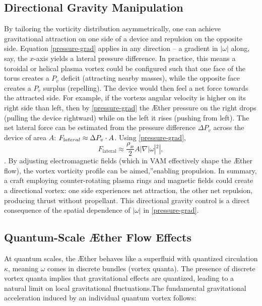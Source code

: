 \subsection*{Directional Gravity Manipulation}
By tailoring the vorticity distribution asymmetrically, one can achieve gravitational attraction on one side of a device and repulsion on the opposite side. Equation \eqref{pressure-grad} applies in any direction – a gradient in $|\omega|$ along, say, the $x$-axis yields a lateral pressure difference. In practice, this means a toroidal or helical plasma vortex could be configured such that one face of the torus creates a $P_v$ deficit (attracting nearby masses), while the opposite face creates a $P_v$ surplus (repelling). The device would then feel a net force towards the attracted side. For example, if the vortex\rqs s angular velocity is higher on its right side than left, then by \eqref{pressure-grad} the Æther pressure on the right drops (pulling the device rightward) while on the left it rises (pushing from left). The net lateral force can be estimated from the pressure difference $\Delta P_v$ across the device of area $A$: $F_{\textrm lateral}\approx \Delta P_v \cdot A$. Using \eqref{pressure-grad},
\begin{equation}
    F_\text{lateral} \approx \frac{\rho_\text{\ae}}{2} A |\nabla |\omega|^2|,
    \label{eq:lateral_force}
\end{equation}
. By adjusting electromagnetic fields (which in VAM effectively shape the Æther flow), the vortex vorticity profile can be \grqq aimed,\textquotedblright enabling propulsion. In summary, a craft employing counter-rotating plasma rings and magnetic fields could create a directional vortex: one side experiences net attraction, the other net repulsion, producing thrust without propellant. This directional gravity control is a direct consequence of the spatial dependence of $|\omega|$ in \eqref{pressure-grad}.

\subsection*{Quantum-Scale Æther Flow Effects}
At quantum scales, the Æther behaves like a superfluid with quantized circulation $\kappa$, meaning $\omega$ comes in discrete bundles (vortex quanta). The presence of discrete vortex quanta implies that gravitational effects are quantized, leading to a natural limit on local gravitational fluctuations.The fundamental gravitational acceleration induced by an individual quantum vortex follows:

